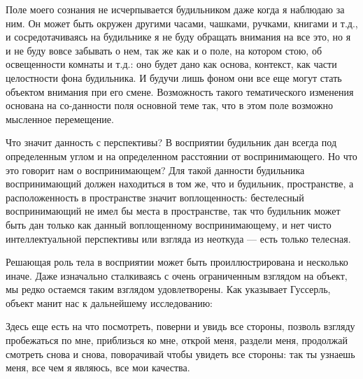\documentclass[11pt]{book}
\begin{document}
Поле моего сознания не исчерпывается будильником даже когда я наблюдаю за ним. Он может быть окружен другими часами, чашками, ручками, книгами и т.д., и сосредотачиваясь на будильнике я не буду обращать внимания на все это, но я и не буду вовсе забывать о нем, так же как и о поле, на котором стою, об освещенности комнаты и т.д.: оно будет дано как основа, контекст, как части целостности фона будильника. И будучи лишь фоном они все еще могут стать объектом внимания при его смене. Возможность такого тематического изменения основана на со-данности поля основной теме так, что в этом поле возможно мысленное перемещение.

Что значит данность с перспективы? В восприятии будильник дан всегда под определенным углом и на определенном расстоянии от воспринимающего. Но что это говорит нам о воспринимающем? Для такой данности будильника воспринимающий должен находиться в том же, что и будильник, пространстве, а расположенность в пространстве значит воплощенность: бестелесный воспринимающий не имел бы места в пространстве, так что будильник может быть дан только как данный воплощенному воспринимающему, и нет чисто интеллектуальной перспективы или взгляда из неоткуда --- есть только телесная.

Решающая роль тела в восприятии может быть проиллюстрирована и несколько иначе. Даже изначально сталкиваясь с очень ограниченным взглядом на объект, мы редко остаемся таким взглядом удовлетворены. Как указывает Гуссерль, объект манит нас к дальнейшему исследованию:

\smallskip
{}\relax
{}\relax

Здесь еще есть на что посмотреть, поверни и увидь все стороны, позволь взгляду пробежаться по мне, приблизься ко мне, открой меня, раздели меня, продолжай смотреть снова и снова, поворачивай чтобы увидеть все стороны: так ты узнаешь меня, все чем я являюсь, все мои качества.

\relax
{}\relax
\smallskip
\end{document}

